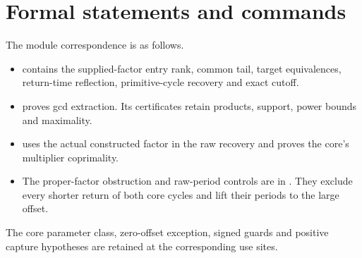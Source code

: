 \documentclass[11pt,letterpaper]{article}
\begin{document}
\section{Formal statements and commands}

The module correspondence is as follows.
\begin{itemize}
\item {} contains the supplied-factor
entry rank, common tail, target equivalences, return-time reflection,
primitive-cycle recovery and exact cutoff.
\item {} proves gcd extraction.
Its certificates retain products, support, power bounds and maximality.
\item {} uses the actual constructed
factor in the raw recovery and proves the core's multiplier coprimality.
\item The proper-factor obstruction and raw-period controls are in
. They exclude every shorter return
of both core cycles and lift their periods to the large offset.
\end{itemize}
The core parameter class, zero-offset exception, signed guards and positive
capture hypotheses are retained at the corresponding use sites.



\end{document}
